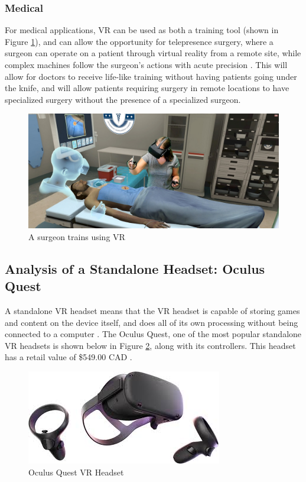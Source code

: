 \subsubsection{Medical}
For medical applications, VR can be used as both a training tool (shown in
Figure \ref{vr:med_train}), and can allow the opportunity for telepresence 
surgery, where a surgeon can operate on a patient through virtual reality 
from a remote site, while complex machines follow the surgeon's actions 
with acute precision \cite{vr_med_app}. This will allow for doctors to receive
life-like training without having patients going under the knife, and will allow
patients requiring surgery in remote locations to have specialized surgery without the
presence of a specialized surgeon.

\begin{figure}[h!]
    \centering
    \includegraphics[width=.6\linewidth]{media/med_training_vr.jpg}
    \caption{A surgeon trains using VR \cite{med_train_vr}}
    \label{vr:med_train}
\end{figure}

\subsection{Analysis of a Standalone Headset: Oculus Quest}
A standalone VR headset means that the VR headset is capable of storing games and
content on the device itself, and does all of its own processing without being connected
to a computer \cite{standalone_vr}. The Oculus Quest, one of the most popular
standalone VR headsets is shown below in Figure \ref{headsets:pictures}, along with
its controllers. This headset has a retail value of \$549.00 CAD \cite{quest_price}.

\begin{figure}[h]
    \centering
    \includegraphics[width=.6\linewidth]{media/oculus_quest.jpg}
    \caption{Oculus Quest VR Headset \cite{quest_headset}}
    \label{headsets:pictures}
\end{figure}

